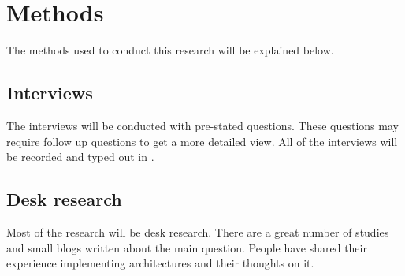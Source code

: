 \section{Methods}

The methods used to conduct this research will be explained below.

\subsection{Interviews}
The interviews will be conducted with pre-stated questions. These questions may require follow up questions to get a more detailed view. All of the interviews will be recorded and typed out in .

\subsection{Desk research}
Most of the research will be desk research. There are a great number of studies and small blogs written about the main question. People have shared their experience implementing architectures and their thoughts on it.
